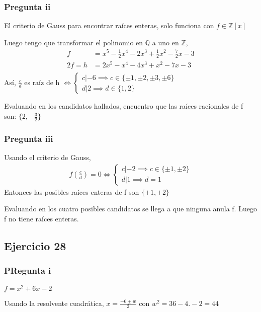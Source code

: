 \subsubsection{Pregunta ii}

El criterio de Gauss para encontrar raíces enteras, solo funciona con $ f \in \mathbb{Z}[x] $

Luego tengo que transformar el polinomio en $ \mathbb{Q} $ a uno en $ \mathbb{Z} $,
\begin{align*}
    f &= x^5 - \frac{1}{2}x^4 - 2x^3 + \frac{1}{2}x^2 - \frac{7}{2}x - 3 \\
    2f = h &= 2x^5 - x^4 - 4x^3 + x^2 - 7x - 3 \\
\end{align*}
Así, $ \frac{c}{d} $ es raíz de h $ \iff \begin{cases}
    c|-6 \implies c \in \{ \pm 1, \pm 2, \pm 3, \pm 6 \} \\
    d|2 \implies d \in \{ 1,2 \}
\end{cases} $

Evaluando en los candidatos hallados, encuentro que las raíces racionales de f son: $ \{ 2, -\frac{3}{2} \} $

\subsubsection{Pregunta iii}
Usando el criterio de Gauss, 
\begin{align*}
    f(\frac{c}{d}) = 0 \iff \begin{cases}
        c|-2 \implies c \in \{ \pm 1, \pm 2 \} \\
        d|1 \implies d = 1
    \end{cases}
\end{align*}
Entonces las posibles raíces enteras de f son $ \{ \pm 1, \pm 2 \} $

Evaluando en los cuatro posibles candidatos se llega a que ninguna anula f. Luego f no tiene raíces enteras.

\subsection{Ejercicio 28}
\subsubsection{PRegunta i}
$ f = x^2 +6x - 2 $

Usando la resolvente cuadrática, $ x = \frac{-6 \pm w }{2} $ con $ w^2 = 36-4.-2 = 44 $


